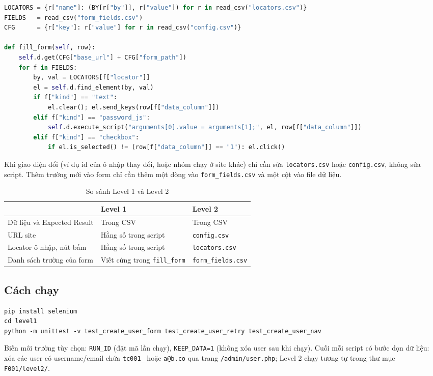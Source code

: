 \documentclass[12pt,a4paper]{article}
\begin{document}
\begin{lstlisting}[language=Python]
LOCATORS = {r["name"]: (BY[r["by"]], r["value"]) for r in read_csv("locators.csv")}
FIELDS   = read_csv("form_fields.csv")
CFG      = {r["key"]: r["value"] for r in read_csv("config.csv")}

def fill_form(self, row):
    self.d.get(CFG["base_url"] + CFG["form_path"])
    for f in FIELDS:
        by, val = LOCATORS[f["locator"]]
        el = self.d.find_element(by, val)
        if f["kind"] == "text":
            el.clear(); el.send_keys(row[f["data_column"]])
        elif f["kind"] == "password_js":
            self.d.execute_script("arguments[0].value = arguments[1];", el, row[f["data_column"]])
        elif f["kind"] == "checkbox":
            if el.is_selected() != (row[f["data_column"]] == "1"): el.click()
\end{lstlisting}
Khi giao diện đổi (ví dụ id của ô nhập thay đổi, hoặc nhóm chạy ở site khác) chỉ cần sửa \texttt{locators.csv} hoặc \texttt{config.csv}, không sửa script. Thêm trường mới vào form chỉ cần thêm một dòng vào \texttt{form\_fields.csv} và một cột vào file dữ liệu.

\begin{table}[H]
\centering\small
\begin{tabular}{|L{3.4cm}|L{5.4cm}|L{5.4cm}|}
\hline
{} & \textbf{Level 1} & \textbf{Level 2} \\ \hline
Dữ liệu và Expected Result & Trong CSV & Trong CSV \\ \hline
URL site & Hằng số trong script & \texttt{config.csv} \\ \hline
Locator ô nhập, nút bấm & Hằng số trong script & \texttt{locators.csv} \\ \hline
Danh sách trường của form & Viết cứng trong \texttt{fill\_form} & \texttt{form\_fields.csv} \\ \hline
\end{tabular}
\caption{So sánh Level 1 và Level 2}
\end{table}

\subsection{Cách chạy}
\begin{lstlisting}
pip install selenium
cd level1
python -m unittest -v test_create_user_form test_create_user_retry test_create_user_nav
\end{lstlisting}
Biến môi trường tùy chọn: \texttt{RUN\_ID} (đặt mã lần chạy), \texttt{KEEP\_DATA=1} (không xóa user sau khi chạy). Cuối mỗi script có bước dọn dữ liệu: xóa các user có username/email chứa \texttt{tc001\_} hoặc \texttt{a@b.co} qua trang \texttt{/admin/user.php}; Level 2 chạy tương tự trong thư mục \texttt{F001/level2/}.
\end{document}
